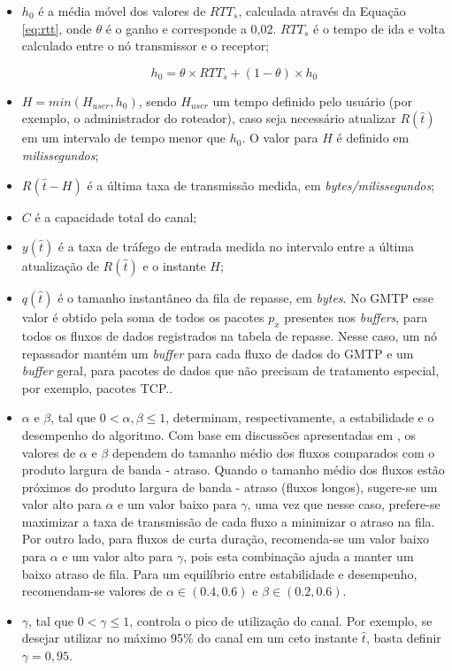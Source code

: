 \begin{itemize}
\item $h_0$ é a média móvel dos valores de $RTT_s$, calculada através da Equação \ref{eq:rtt}, onde $\theta$ é o ganho e corresponde a 0,02. $RTT_s$ é o tempo de ida e volta calculado entre o nó transmissor e o receptor;

\begin{equation}
\label{eq:rtt}
h_0 = \theta \times RTT_s + (1 - \theta) \times h_0
\end{equation}

\item $H=min(H_{user}, h_0)$, sendo $H_{user}$ um tempo definido pelo usuário (por exemplo, o administrador do roteador), caso seja necessário atualizar $R(\hat{t})$ em um intervalo de tempo menor que $h_0$. O valor para $H$ é definido em \emph{milissegundos};
\item $R(\hat{t}-H)$ é a última taxa de transmissão medida, em \emph{bytes/milissegundos};
\item $C$ é a capacidade total do canal;
\item $y(\hat{t})$ é a taxa de tráfego de entrada medida no intervalo entre a última atualização de $R(\hat{t})$ e o instante $H$;
\item $q(\hat{t})$ é o tamanho instantâneo da fila de repasse, em \emph{bytes}. No GMTP esse valor é obtido pela soma de todos os pacotes $p_x$ presentes nos \textit{buffers}, para todos os fluxos de dados registrados na tabela de repasse. Nesse caso, um nó repassador mantém um \textit{buffer} para cada fluxo de dados do GMTP e um \textit{buffer} geral, para pacotes de dados que não precisam de tratamento especial, por exemplo, pacotes TCP..
\item $\alpha$ e $\beta$, tal que $0<\alpha,\beta\leq1$, determinam, respectivamente, a estabilidade e o desempenho do algoritmo. Com base em discussões apresentadas em \cite{dukkipati2007rate}, os valores de $\alpha$ e $\beta$ dependem do tamanho médio dos fluxos comparados com o produto largura de banda - atraso. 
Quando o tamanho médio dos fluxos estão próximos do produto largura de banda - atraso (fluxos longos), sugere-se um valor alto para $\alpha$ e um valor baixo para $\gamma$, uma vez que nesse caso, prefere-se maximizar a taxa de transmissão de cada fluxo a minimizar o atraso na fila.
Por outro lado, para fluxos de curta duração, recomenda-se um valor baixo para $\alpha$ e um valor alto para $\gamma$, pois esta combinação ajuda a manter um baixo atraso de fila.
Para um equilíbrio entre estabilidade e desempenho, recomendam-se valores de $\alpha \in (0.4, 0.6)$ e $\beta \in (0.2, 0.6)$.
\item $\gamma$, tal que $0<\gamma\leq1$, controla o pico de utilização do canal. Por exemplo, se desejar utilizar no máximo 95\% do canal em um ceto instante $\hat{t}$, basta definir $\gamma=0,95$.
\end{itemize}

